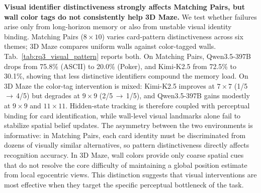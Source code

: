 \documentclass{llmxive}
\providecommand{\paragraph}[1]{\vspace{1mm}\noindent\textbf{#1}}
\begin{document}
\noindent\textbf{Visual identifier distinctiveness strongly affects Matching Pairs, but wall color tags do not consistently help 3D Maze.} We test whether failures arise only from long-horizon memory or also from unstable visual identity binding. Matching Pairs ($8{\times}10$) varies card-pattern distinctiveness across six themes; 3D Maze compares uniform walls against color-tagged walls. Tab.~\ref{tab:rq3_visual_pattern} reports both. On Matching Pairs, Qwen3.5-397B drops from 75.8\% (ASCII) to 20.0\% (Poker), and Kimi-K2.5 from 72.5\% to 30.1\%, showing that less distinctive identifiers compound the memory load. On 3D Maze the color-tag intervention is mixed: Kimi-K2.5 improves at $7{\times}7$ (1/5\,$\to$\,4/5) but degrades at $9{\times}9$ (2/5\,$\to$\,1/5), and Qwen3.5-397B gains modestly at $9{\times}9$ and $11{\times}11$. Hidden-state tracking is therefore coupled with perceptual binding for card identification, while wall-level visual landmarks alone fail to stabilize spatial belief updates. The asymmetry between the two environments is informative: in Matching Pairs, each card identity must be discriminated from dozens of visually similar alternatives, so pattern distinctiveness directly affects recognition accuracy. In 3D Maze, wall colors provide only coarse spatial cues that do not resolve the core difficulty of maintaining a global position estimate from local egocentric views. This distinction suggests that visual interventions are most effective when they target the specific perceptual bottleneck of the task.



\end{document}
